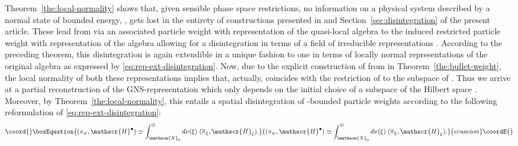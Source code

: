 \documentclass[a4paper,a4paper]{article}
\numberwithin{equation}{section}
\providecommand{\Xecm}{\mathecm{X}}
\providecommand{\Afrak}{\mathfrak{A}}
\providecommand{\Hscr}{\mathscr{H}}
\providecommand{\Sscr}{\mathscr{S}}
\providecommand{\pibar}{\overline{\pi}}
\providecommand{\Hbullet}{\mathscr{H}^\bullet}
\providecommand{\Abullet}{\mathfrak{A}^\bullet}
\theoremstyle{definition}
\theoremstyle{plain}
\theoremstyle{remark}
\theoremstyle{assumption}
\providecommand{\bset}[1]{\bigl\{ #1 \bigr\}}
\providecommand{\scp}[2]{\langle #1 \vert #2 \rangle}
\begin{document}
  Theorem~\ref{the:local-normality} shows that, given sensible phase
  space restrictions, no information on a physical system described by
  a normal state of bounded energy, \myHighlight{$\omega \in \Sscr ( \Delta )$}\coordHE{},
  gets lost in the entirety of constructions presented in
  \cite[Section~3]{porrmann:2002a} and
  Section~\ref{sec:disintegration} of the present article. These lead
  from \myHighlight{$\omega$}\coordHE{} via an associated particle weight with representation
  \myHighlight{$( \pi_w , \Hscr_w )$}\coordHE{} of the quasi-local algebra \myHighlight{$\Afrak$}\coordHE{} to the
  induced restricted particle weight with representation \myHighlight{$(
  \pi^\bullet , \Hbullet )$}\coordHE{} of the algebra \myHighlight{$\Abullet$}\coordHE{} allowing for a
  disintegration in terms of a field of irreducible representations
  \myHighlight{$\bset{( \pi_\xi , \Hscr_\xi ) : \xi \in \Xecm_0}$}\coordHE{}. According to the
  preceding theorem, this disintegration is again extendible in a
  unique fashion to one in terms of locally normal representations of
  the original algebra \myHighlight{$\Afrak$}\coordHE{} as expressed by
  \eqref{eq:rep-ext-disintegration}. Now, due to the explicit
  construction of \myHighlight{$( \pi^\bullet , \Hbullet)$}\coordHE{} from \myHighlight{$( \pi_w ,
  \Hscr_w)$}\coordHE{} in Theorem~\ref{the:bullet-weight}, the local normality of
  both these representations implies that, actually, \myHighlight{$\pibar^\bullet$}\coordHE{}
  coincides with the restriction of \coordHE{} to the subspace \myHighlight{$\Hbullet$}\coordHE{}
  of \myHighlight{$\Hscr_w$}\coordHE{}. Thus we arrive at a partial reconstruction of the
  GNS-representation \myHighlight{$( \pi_w , \Hscr_w )$}\coordHE{} which only depends on the
  initial choice of a subspace of the Hilbert space \myHighlight{$\Hscr_w$}\coordHE{}.
  Moreover, by Theorem~\ref{the:local-normality}, this entails a
  spatial disintegration of \myHighlight{$\Delta$}\coordHE{}-bounded particle weights
  \myHighlight{$\scp{~.~}{~.~}$}\coordHE{} according to the following reformulation of
  \eqref{eq:rep-ext-disintegration}:
  \begin{equation}\coord{}\boxEquation{
    \label{eq:rep-ori-disintegration}
    ( \pi_w , \Hbullet ) \simeq \int_{\Xecm_0}^\oplus d \nu ( \xi ) \;
    ( \pibar_\xi , \Hscr_\xi ) \text{.}
  }{
    ( \pi_w , \Hbullet ) \simeq \int_{\Xecm_0}^\oplus d \nu ( \xi ) \;
    ( \pibar_\xi , \Hscr_\xi ) \text{.}
  }{ecuacion}\coordE{}\end{equation}
\end{document}
